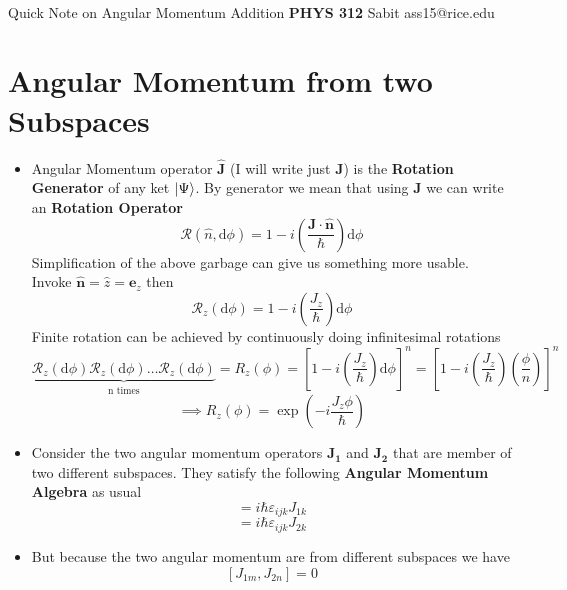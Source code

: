 \documentclass[11pt]{article}
\newcommand{\hb}{\hbar}
\renewcommand{\vec}{\mathbf}
\begin{document}
\thispagestyle{empty}
\bigskip \
\vspace{0.1cm}

\begin{center}
{\fontsize{22}{22} \selectfont Quick Note on Angular Momentum Addition}
\vskip 16pt
{\fontsize{36}{36} \selectfont \bf \sffamily PHYS 312}
\vskip 24pt
{\fontsize{18}{18} \selectfont \rmfamily Sabit} 
\vskip 6pt
{\fontsize{14}{14} \selectfont \ttfamily ass15@rice.edu} 
\vskip 24pt
\end{center}

{\parindent0pt \baselineskip=15.5pt 



\newpage

\section{Angular Momentum from two Subspaces}
\begin{itemize}
	\item Angular Momentum operator $\hat{\vec{J}}$ (I will write just $\vec{J}$) is the \textbf{Rotation Generator} of any ket $\lvert\Psi\rangle$. By generator we mean that using $\vec{J}$ we can write an \textbf{Rotation Operator} 
		\begin{equation}
			\mathcal R (\hat{n}, \mathrm{d} \phi) = 1 - i \left(\frac{\vec{J} \cdot  \hat{\vec{n}}}{\hb}\right) \mathrm{d} \phi
		\end{equation}
		Simplification of the above garbage can give us something more usable. Invoke $\hat{\vec{n}} = \hat{z} = \vec{e}_z$ then 
		\[
		\mathcal R_z(\mathrm{d} \phi) = 1- i \left(\frac{J_z}{\hb}\right) \mathrm{d} \phi
		\]
		Finite rotation can be achieved by continuously doing infinitesimal rotations 
		\[\underbrace{
		\mathcal R_z(\mathrm{d} \phi)
		\mathcal R_z(\mathrm{d} \phi)\ldots
	\mathcal R_z(\mathrm{d} \phi)}_{\text{n times}} = \mathit R_z(\phi) = 
	\left[ 1 - i \left(\frac{J_z}{\hb}\right) \mathrm{d} \phi \right] ^{n}
	= 
	\left[ 1 - i \left(\frac{J_z}{\hb}\right)  \left(\frac{\phi}{n}\right) \right] ^{n}
		\] 
		\begin{equation} \implies
			\mathit R_z (\phi) = \exp \left( - i \frac{J_z \phi}{\hb}\right)
		\end{equation}
	\item Consider the two angular momentum operators $\vec{J_1}$ and $\vec{J_2}$ that are member of two different subspaces. They satisfy the following \textbf{Angular Momentum Algebra} as usual
		\begin{equation}
			[J_{1i}, J_{1j}] = i \hb \varepsilon_{ijk} J_{1k}
		\end{equation}
		\begin{equation}
			[J_{2i}, J_{2j}] = i \hb \varepsilon_{ijk} J_{2k}
		\end{equation}
	\item But because the two angular momentum are from different subspaces we have 
		\[
			[J_{1m}, J_{2n}] = 0 
		\] 
\end{itemize}


}
\end{document}
